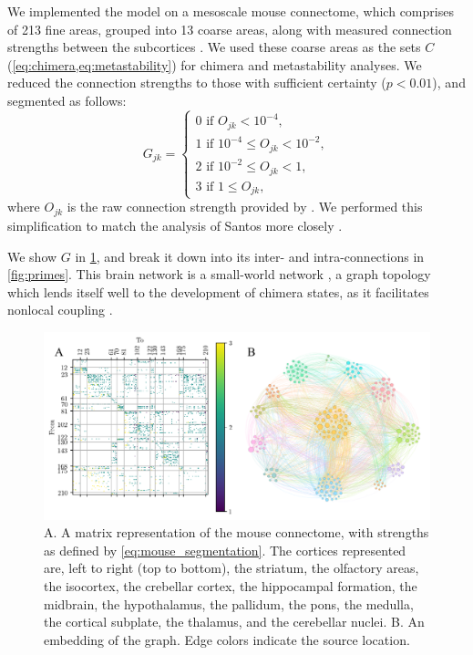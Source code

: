 We implemented the model on a mesoscale mouse connectome,
which comprises of 213 fine areas,
grouped into 13 coarse areas,
along with measured connection strengths between the subcortices \cite{Oh2014}.
We used these coarse areas as the sets $C$ (\cref{eq:chimera,eq:metastability}) for chimera and metastability analyses.
We reduced the connection strengths to those with sufficient certainty ($p < 0.01$), and segmented as follows:
\begin{equation}
  \label{eq:mouse_segmentation}
  G_{j k}
  =
  \begin{cases}
    0 \text{ if } O_{j k} < 10^{-4}, \\
    1 \text{ if } 10^{-4} \leq O_{j k} < 10^{-2}, \\
    2 \text{ if } 10^{-2} \leq O_{j k} < 1, \\
    3 \text{ if } 1 \leq O_{j k},
  \end{cases}
\end{equation}
where $O_{j k}$ is the raw connection strength provided by \cite{Oh2014}.
We performed this simplification to match the analysis of Santos \etal more closely \cite{Santos2017}.

We show $G$ in \cref{fig:mouse_connectome}, and break it down into its inter- and intra-connections in \cref{fig:primes}.
This brain network is a small-world network \cite{Oh2014},
a graph topology which lends itself well to the development of chimera states, as it facilitates nonlocal coupling \cite{Hizanidis2016}.

\begin{figure}[ht]
  \centering
  \includegraphics[width=\textwidth]{figure/network.pdf}
  \caption[Mouse connectome]{A. A matrix representation of the mouse connectome, with strengths as defined by \cref{eq:mouse_segmentation}.
    The cortices represented are, left to right (top to bottom),
    the striatum,
    the olfactory areas,
    the isocortex,
    the crebellar cortex,
    the hippocampal formation,
    the midbrain,
    the hypothalamus,
    the pallidum,
    the pons,
    the medulla,
    the cortical subplate,
    the thalamus,
    and the cerebellar nuclei.
    B. An embedding of the graph.
    Edge colors indicate the source location.
  }
  \label{fig:mouse_connectome}
\end{figure}

